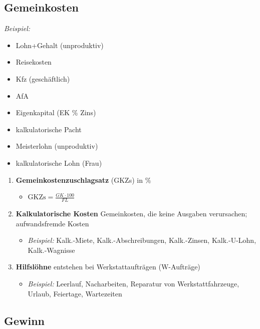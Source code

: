 \subsection{Gemeinkosten}\label{gemeinkosten}

\emph{Beispiel:}

\begin{itemize}
\item
  Lohn+Gehalt (unproduktiv)
\item
  Reisekosten
\item
  Kfz (geschäftlich)
\item
  AfA
\item
  Eigenkapital (EK \% Zins)
\item
  kalkulatorische Pacht
\item
  Meisterlohn (unproduktiv)
\item
  kalkulatorische Lohn (Frau)
\end{itemize}

\begin{enumerate}
\item
  \textbf{Gemeinkostenzuschlagsatz} (GKZs) in \%

  \begin{itemize}
  \item
    $\boxed{\text{GKZs} = \frac{GK \cdot 100}{FL}}$
  \end{itemize}
\item
  \textbf{Kalkulatorische Kosten} Gemeinkosten, die keine Ausgaben
  verursachen; aufwandsfremde Kosten

  \begin{itemize}
  \item
    \emph{Beispiel:} Kalk.-Miete, Kalk.-Abschreibungen, Kalk.-Zinsen,
    Kalk.-U-Lohn, Kalk.-Wagnisse
  \end{itemize}
\item
  \textbf{Hilfslöhne} entstehen bei Werkstattaufträgen (W-Aufträge)

  \begin{itemize}
  \item
    \emph{Beispiel:} Leerlauf, Nacharbeiten, Reparatur von
    Werkstattfahrzeuge, Urlaub, Feiertage, Wartezeiten
  \end{itemize}
\end{enumerate}

\subsection{Gewinn}\label{gewinn}

